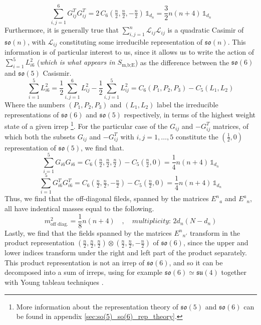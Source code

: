 %
%
\begin{equation}
\sum_{i,j=1}^6 G^T_{ij} G^T_{ij}
=
2 \, C_6(\tfrac{n}{2},\tfrac{n}{2},-\tfrac{n}{2}) \, \mathbb{1}_{d_n}
=
\frac{3}{2} n (n + 4) \, \mathbb{1}_{d_n}
\end{equation}
%
%
Furthermore, it is generally true that $\sum_{i,j=1}^n \mathcal{L}_{ij} \mathcal{L}_{ij}$ is a quadratic Casimir of $\mathfrak{so}(n)$, with $\mathcal{L}_{ij}$ constituting some irreducible representation of $\mathfrak{so}(n)$. This information is of particular interest to us, since it allows us to write the action of $\sum_{i=1}^5 L^2_{i6}$ (\textit{which is what appears in $S_{\text{m,b;E}}$}) as the difference between the $\mathfrak{so}(6)$ and $\mathfrak{so}(5)$ Casismir.
%
%
\begin{equation}\label{so(6) so(6) casimir differnce}
\sum_{i=1}^5 L^2_{i6}
=
\frac{1}{2} \sum_{i,j=1}^6 L^2_{ij} - \frac{1}{2} \sum_{i,j=1}^5 L^2_{ij}
=
C_6(P_1,P_2,P_3) - C_5(L_1,L_2)
\end{equation}
%
%
Where the numbers $(P_1, P_2, P_3)$ and $(L_1,L_2)$ label the irreducible representations of $\mathfrak{so}(6)$ and $\mathfrak{so}(5)$ respectively, in terms of the highest weight state of a given irrep \footnote{More information about the representation theory of $\mathfrak{so}(5)$ and $\mathfrak{so}(6)$ can be found in appendix \ref{sec:so(5)_so(6)_rep_theory}.}. For the particular case of the $G_{ij}$ and $-G^T_{ij}$ matrices, of which both the subsets $G_{ij}$ and $-G^T_{ij}$ with $i,j=1,\ldots,5$ constitute the $(\tfrac{1}{2},0)$ representation of $\mathfrak{so}(5)$, we find that.
%
%
\begin{equation}
\sum_{i=1}^5 G_{i6} G_{i6}
=
C_6(\tfrac{n}{2},\tfrac{n}{2},\tfrac{n}{2}) - C_5(\tfrac{n}{2},0)
=
\frac{1}{4} n (n+4) \, \mathbb{1}_{d_n}
\end{equation}
%
%
\begin{equation}
\sum_{i=1}^5 G^T_{i6} G^T_{i6}
=
C_6(\tfrac{n}{2},\tfrac{n}{2},-\tfrac{n}{2}) - C_5(\tfrac{n}{2},0)
=
\frac{1}{4} n (n+4) \, \mathbb{1}_{d_n}
\end{equation}
%
%
Thus, we find that the off-diagonal fileds, spanned by the matrices ${E^{n}}_{a}$ and ${E^{a}}_{n}$, all have indentical masses equal to the following.
%
%
\begin{equation}
m^2_{\text{off diag.}} = \frac{1}{8} n (n + 4)
%
\quad , \quad
%
\textit{multiplicity: } 2 d_n (N - d_n)
\end{equation}
%
%
Lastly, we find that the fields spanned by the matrices ${E^{n}}_{n'}$ transform in the product representation $(\tfrac{n}{2},\tfrac{n}{2},\tfrac{n}{2}) \otimes (\tfrac{n}{2},\tfrac{n}{2},-\tfrac{n}{2})$ of $\mathfrak{so}(6)$, since the upper and lower indices transform under the right and left part of the product separately. This product representation is not an irrep of $\mathfrak{so}(6)$, and so it can be decomposed into a sum of irreps, using for example $\mathfrak{so}(6) \simeq \mathfrak{su}(4)$  together with Young tableau techniques \cite{Lie groups and Lie algebras}.
